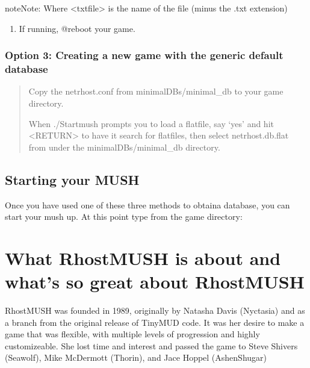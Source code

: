 \documentclass[letterpaper,10pt,english]{sphinxmanual}
\begin{document}
\begin{sphinxadmonition}{note}{Note:}
\sphinxAtStartPar
Where \textless{}txtfile\textgreater{} is the name of the file (minus the .txt extension)
\end{sphinxadmonition}
\begin{enumerate}
%
\item {} 
\sphinxAtStartPar
If running, @reboot your game.

\end{enumerate}


\subsection{Option 3: Creating a new game with the generic default database}
\label{\detokenize{install:option-3-creating-a-new-game-with-the-generic-default-database}}\begin{quote}

\sphinxAtStartPar
Copy the netrhost.conf from minimal\sphinxhyphen{}DBs/minimal\_db to your game directory.

\sphinxAtStartPar
When ./Startmush prompts you to load a flatfile, say ‘yes’ and hit \textless{}RETURN\textgreater{}
to have it search for flatfiles, then select netrhost.db.flat from under
the minimal\sphinxhyphen{}DBs/minimal\_db directory.
\end{quote}


\section{Starting your MUSH}
\label{\detokenize{install:starting-your-mush}}
\sphinxAtStartPar
Once you have used one of these three methods to obtaina database, you can start your mush up.
At this point type from the game directory:

\begin{sphinxVerbatim}[commandchars=\\\{\}]
\end{sphinxVerbatim}


\chapter{What RhostMUSH is about and what’s so great about RhostMUSH}
\label{\detokenize{features:what-rhostmush-is-about-and-what-s-so-great-about-rhostmush}}\label{\detokenize{features::doc}}
\sphinxAtStartPar
RhostMUSH was founded in 1989, originally by Natasha Davis (Nyctasia) and as
a branch from the original release of TinyMUD code.  It was her desire to make
a game that was flexible, with multiple levels of progression and highly
customizeable.  She lost time and interest and passed the game to
Steve Shivers (Seawolf), Mike McDermott (Thorin), and Jace Hoppel (Ashen\sphinxhyphen{}Shugar)
\end{document}
